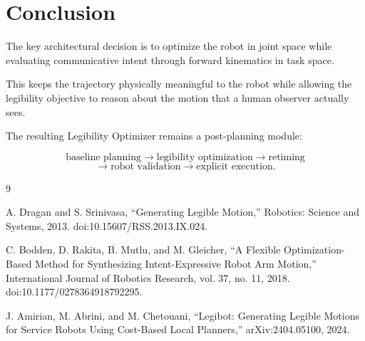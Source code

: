 \documentclass[11pt]{article}
\begin{document}
\section{Conclusion}

The key architectural decision is to optimize the robot in
joint space while evaluating communicative intent through
forward kinematics in task space.

This keeps the trajectory physically meaningful to the robot
while allowing the legibility objective to reason about the
motion that a human observer actually sees.

The resulting Legibility Optimizer remains a post-planning
module:

\[
\text{baseline planning}
\rightarrow
\text{legibility optimization}
\rightarrow
\text{retiming}
\]
\[
\longrightarrow
\text{robot validation}
\rightarrow
\text{explicit execution}.
  \]

  \begin{thebibliography}{9}

  A. Dragan and S. Srinivasa,
  ``Generating Legible Motion,''
  Robotics: Science and Systems,
  2013.
  doi:10.15607/RSS.2013.IX.024.

  C. Bodden, D. Rakita, B. Mutlu, and M. Gleicher,
  ``A Flexible Optimization-Based Method for Synthesizing
  Intent-Expressive Robot Arm Motion,''
  International Journal of Robotics Research,
  vol. 37, no. 11,
  2018.
  doi:10.1177/0278364918792295.

  J. Amirian, M. Abrini, and M. Chetouani,
  ``Legibot: Generating Legible Motions for Service Robots
  Using Cost-Based Local Planners,''
  arXiv:2404.05100,
  2024.

  \end{thebibliography}

  
\end{document}
